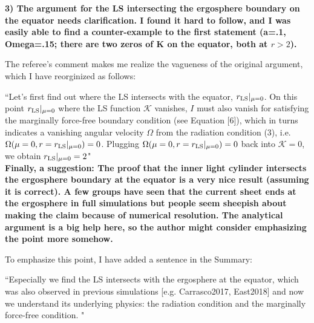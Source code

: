 \documentclass[10pt]{article}
\begin{document}
{\bf 3) The argument for the LS intersecting the ergosphere boundary on the equator needs
clarification. I found it hard to follow, and I was easily able to find a counter-example to the first
statement (a=.1, Omega=.15; there are two zeros of K on the equator, both at $r>2$). }

The referee's comment makes me realize the vagueness of the original argument, which I have reorginized as follows:

``Let's first find out where the LS intersects with the equator, $r_{\rm LS}|_{\mu=0}$.
On this point $r_{\rm LS}|_{\mu=0}$ where the LS function $\mathcal K$ vanishes,
$I$ must also vanish for satisfying the marginally force-free boundary condition (see Equation [6]),
which in turns indicates a vanishing angular velocity $\Omega$ from
the radiation condition (3), i.e. $\Omega(\mu=0, r= r_{\rm LS}|_{\mu=0}) =0$.
Plugging $\Omega(\mu=0, r= r_{\rm LS}|_{\mu=0}) =0$ back into $\mathcal K = 0$,
we obtain $r_{\rm LS}|_{\mu=0}=2$" \\ 

{\bf Finally, a suggestion:
The proof that the inner light cylinder intersects the ergosphere boundary at the equator is
a very nice result (assuming it is correct). A few groups have seen that the current sheet
ends at the ergosphere in full simulations but people seem sheepish about making the claim
because of numerical resolution. The analytical argument is a big help here, so the author
might consider emphasizing the point more somehow.}

To emphasize this point, I have added a sentence in the Summary:

``Especially we find the LS
intersects with the ergosphere at the equator, which was also observed in previous simulations
[e.g. Carrasco2017, East2018] and now we understand its underlying physics:
the radiation condition and the marginally force-free condition. "
\end{document}
